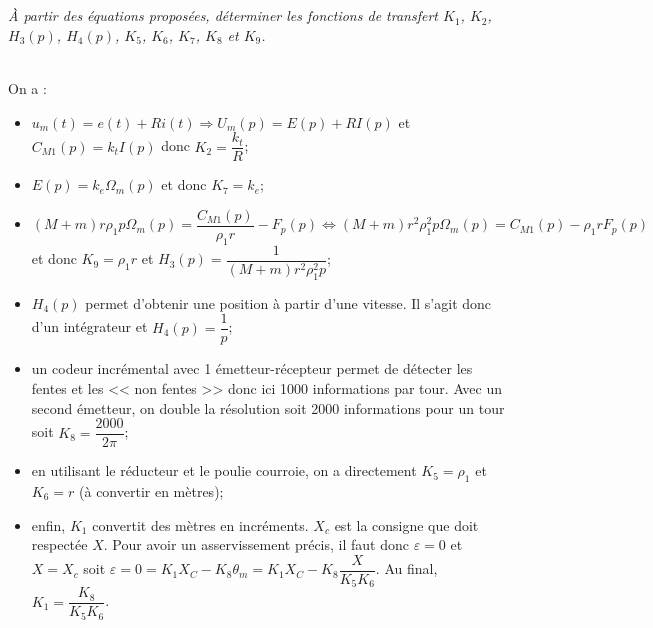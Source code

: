 \documentclass[10pt,fleqn]{article} %
\begin{document}
\begin{multicols}{2}
\subparagraph{}\textit{À partir des équations proposées, déterminer les fonctions de transfert $K_1$, $K_2$, $H_3(p)$, $H_4(p)$,  $K_5$, $K_6$, $K_7$, $K_8$ et $K_9$.}
\ifprof
\begin{corrige}~\\
On a :
\begin{itemize}
\item $ u_m(t)=e(t)+Ri(t) \Rightarrow  U_m(p)=E(p)+RI(p) $ et $C_{M1}(p)=k_t I(p)$ donc $K_2 = \dfrac{k_t}{R}$;
\item $E(p)=k_e\Omega_m(p)$ et donc $K_7 = k_e$;
\item $\left(M+m\right)r\rho_1 p\Omega_m(p)=\dfrac{C_{M1}(p)}{\rho_1 r}-F_p(p) \Leftrightarrow\left(M+m\right)r^2\rho_1^2 p\Omega_m(p)=C_{M1}(p)-\rho_1 rF_p(p) $ et donc $K_9 = \rho_1 r$ et $H_3(p)=\dfrac{1}{\left(M+m\right)r^2\rho_1^2 p}$;
\item  $H_4(p)$ permet d'obtenir une position à partir d'une vitesse. Il s'agit donc d'un intégrateur et $H_4(p)=\dfrac{1}{p}$; 
\item un codeur incrémental avec 1 émetteur-récepteur permet de détecter les fentes et les << non fentes >> donc ici 1000 informations par tour. Avec un second émetteur, on double la résolution soit 2000 informations pour un tour soit $K_8  = \dfrac{2000}{2\pi}$;
\item en utilisant le réducteur et le poulie courroie, on a directement $K_5=\rho_1$ et $K_6=r$ (à convertir en mètres);
\item enfin, $K_1$ convertit des mètres en incréments. $X_c$ est la consigne que doit respectée $X$. Pour avoir un asservissement précis, il faut donc $\varepsilon = 0$ et $X=X_c$ soit $\varepsilon = 0 = K_1 X_C - K_8 \theta_m = K_1 X_C - K_8 \dfrac{X}{K_5 K_6}$. Au final, $K_1 =\dfrac{K_8}{K_5 K_6}$.
\end{itemize}
\end{corrige}
\else
\fi


\end{multicols}
\end{document}
